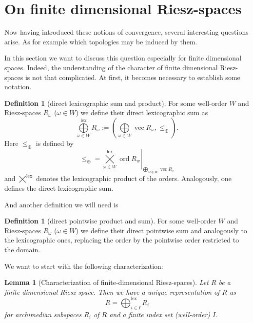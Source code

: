 \documentclass{article}
\newtheorem{lemma}[theorem]{Lemma}
\theoremstyle{definition}
\newtheorem{definition}[theorem]{Definition}
\theoremstyle{remark}
\newcommand{\setprod}{\bigtimes}
\newcommand{\dirsum}{\bigoplus} %
\newcommand{\dirplus}{\oplus}
\newcommand{\rest}[1]{\left. #1\right\vert}
\DeclareMathOperator{\vecspace}{vec} %
\DeclareMathOperator{\ord}{ord} %
\DeclareMathOperator{\lex}{lex}
\begin{document}
\section{On finite dimensional Riesz-spaces}

Now having introduced these notions of convergence, several interesting questions arise. As for example which topologies may be induced by them.

In this section we want to discuss this question especially for finite dimensional spaces.
Indeed, the understanding of the character of finite dimensional Riesz-spaces is not that complicated. 
At first, it becomes necessary to establish some notation. 

\begin{definition}[direct lexicographic sum and product]
For some well-order $W$ and Riesz-spaces $R_\omega$ ($\omega\in W$) we define their direct lexicographic sum as
\begin{equation}
\dirsum\limits^{\lex}_{\omega\in W}{R_\omega} := \left(\dirsum\limits_{\omega\in W}{\vecspace{R_\omega}},\leq_{\dirplus}\right)\text{.}
\end{equation}
Here $\leq_{\dirplus}$ is defined by 
\begin{equation}
\leq_{\dirplus} = \rest{\setprod\limits^{\lex}_{\omega\in W}{\ord{R_w}}}_{\dirsum\limits_{\omega\in W}{\vecspace{R_\omega}}}
\end{equation}
and $\bigtimes\limits^{\lex}$ denotes the lexicographic product of the orders. Analogously, one defines the direct lexicographic sum.
\end{definition}

And another definition we will need is  

\begin{definition}[direct pointwise product and sum]
For some well-order $W$ and Riesz-spaces $R_\omega$ ($\omega\in W$) we define their direct pointwise sum and analogously to the lexicographic ones, replacing the order by the pointwise order restricted to the domain.
\end{definition}

We want to start with the following characterization:

\begin{lemma}[Characterization of finite-dimensional Riesz-spaces]\label{chargen}
Let $R$ be a finite-dimensional Riesz-space. Then we have a unique representation
of $R$ as
\begin{equation}
R = \dirsum^{\lex}_{i\in I}{R_i}
\end{equation}
for archimedian subspaces $R_i$ of $R$ and a finite index set (well-order) $I$.
\end{lemma}
\end{document}
